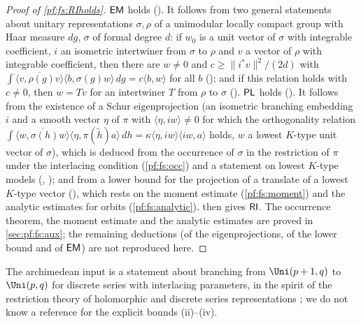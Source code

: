 \begin{proof}[Proof of \cref{pf:fs:RIholds}]
$\mathsf{EM}$ holds (). It follows from two general statements about unitary representations
$\sigma,\rho$ of a unimodular locally compact group with Haar measure $dg$, $\sigma$ of formal degree $d$: if $w_0$ is a unit vector of
$\sigma$ with integrable coefficient, $i$ an isometric intertwiner from $\sigma$ to $\rho$ and $v$ a vector of $\rho$ with integrable
coefficient, then there are $w\ne0$ and $c\ge\|i^*v\|^2/(2d)$ with
$\int\overline{\langle v,\rho(g)v\rangle}\langle b,\sigma(g)w\rangle\,dg=c\langle b,w\rangle$ for all $b$
(); and if this relation holds with $c\ne0$, then $w=Tv$ for an intertwiner $T$ from
$\rho$ to $\sigma$ (). $\mathsf{PL}$ holds
(). It follows from the existence of a Schur eigenprojection (an isometric branching
embedding $i$ and a smooth vector $\eta$ of $\pi$ with $\langle\eta,iw\rangle\ne0$ for which the orthogonality relation
$\int\overline{\langle w,\sigma(h)w\rangle}\langle\eta,\pi(\tilde h)a\rangle\,dh=\kappa\langle\eta,iw\rangle\langle iw,a\rangle$ holds,
$w$ a lowest $K$-type unit vector of $\sigma$), which is deduced from the occurrence of $\sigma$ in the restriction of $\pi$ under the
interlacing condition (\cref{pf:fs:occ}) and a statement on lowest $K$-type models
(, ); and from a lower bound for the
projection of a translate of a lowest $K$-type vector (), which rests on the moment estimate
(\cref{pf:fs:moment}) and the analytic estimates for orbits (\cref{pf:fs:analytic}).  then gives $\mathsf{RI}$. The
occurrence theorem, the moment estimate and the analytic estimates are proved in \cref{sec:pf:fs:aux}; the remaining deductions (of the
eigenprojections, of the lower bound and of $\mathsf{EM}$) are not reproduced here.
\end{proof}

The archimedean input is a statement about branching from $\Uni(p+1,q)$ to $\Uni(p,q)$ for discrete series with interlacing parameters,
in the spirit of the restriction theory of holomorphic and discrete series representations \cite{JakobsenVergne1979,Knapp1986}; we do not
know a reference for the explicit bounds (ii)--(iv).

